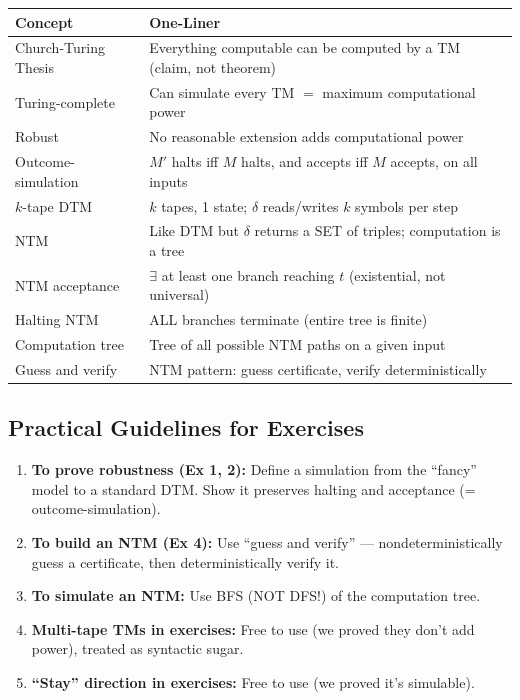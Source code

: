 \documentclass[11pt,a4paper]{article}
\begin{document}
\begin{center}
\renewcommand{\arraystretch}{1.3}
\begin{tabular}{lp{9cm}}
\toprule
\textbf{Concept} & \textbf{One-Liner} \\
\midrule
Church-Turing Thesis & Everything computable can be computed by a TM (claim, not theorem) \\
Turing-complete & Can simulate every TM $=$ maximum computational power \\
Robust & No reasonable extension adds computational power \\
Outcome-simulation & $M'$ halts iff $M$ halts, and accepts iff $M$ accepts, on all inputs \\
$k$-tape DTM & $k$ tapes, 1 state; $\delta$ reads/writes $k$ symbols per step \\
NTM & Like DTM but $\delta$ returns a SET of triples; computation is a tree \\
NTM acceptance & $\exists$ at least one branch reaching $t$ (existential, not universal) \\
Halting NTM & ALL branches terminate (entire tree is finite) \\
Computation tree & Tree of all possible NTM paths on a given input \\
Guess and verify & NTM pattern: guess certificate, verify deterministically \\
\bottomrule
\end{tabular}
\end{center}

\subsection{Practical Guidelines for Exercises}

\begin{enumerate}[nosep]
\item \textbf{To prove robustness (Ex 1, 2):} Define a simulation from the ``fancy'' model to a standard DTM. Show it preserves halting and acceptance (= outcome-simulation).
\item \textbf{To build an NTM (Ex 4):} Use ``guess and verify'' --- nondeterministically guess a certificate, then deterministically verify it.
\item \textbf{To simulate an NTM:} Use BFS (NOT DFS!) of the computation tree.
\item \textbf{Multi-tape TMs in exercises:} Free to use (we proved they don't add power), treated as syntactic sugar.
\item \textbf{``Stay'' direction in exercises:} Free to use (we proved it's simulable).
\end{enumerate}
\end{document}
